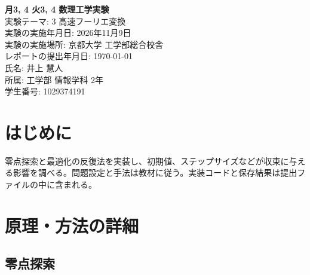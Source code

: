 \documentclass[a4j]{jarticle}
\begin{document}
\begin{titlepage}
    \centering
    \vspace*{2cm}  %
    
    {\Huge \textbf{月3, 4 火3, 4 数理工学実験}}\\[1.5cm]
    
    {\huge 実験テーマ: 3 高速フーリエ変換}\\[2cm]
    
    
    {\Large 
    実験の実施年月日: 2026年11月9日 \\[1cm]
    実験の実施場所: 京都大学 工学部総合校舎 \\[1cm]
    レポートの提出年月日: \today \\[1cm]
    氏名: 井上 慧人 \\[1cm]
    所属: 工学部 情報学科 2年\\[1cm]
    学生番号: 1029374191 \\[0.5cm]
    }
    
    \vfill %
    
\end{titlepage}

\newpage


\begin{abstract}
関数の零点や関数値が小さくなる点を求める方法をPythonで実装し、それぞれの結果を比較した。零点探索では、二分法とニュートン法のどちらでも、$-3$、$-1$、$2$に近い値が得られた。最適化では、最急降下法とニュートン法でほぼ同じ点に到達したが、更新回数には違いがあった。課題4ではそれぞれ31回と6回、課題5では791回と5回であり、今回はニュートン法の方が少ない更新で解を求められた。このことから、進む方向の決め方によって、解に到達するまでの更新回数が大きく変わることが分かった。また、課題6では制約のある最適化問題について調べ、課題6-4で求めた数値解が解析解と一致することを確認した。
\end{abstract}


\section{はじめに}
零点探索と最適化の反復法を実装し、初期値、ステップサイズなどが収束に与える影響を調べる。問題設定と手法は教材に従う。実装コードと保存結果は提出ファイルの中に含まれる。

\section{原理・方法の詳細}
\subsection{零点探索}
\end{document}
